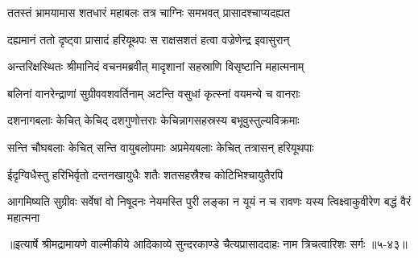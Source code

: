 \twolineshloka
{ततस्तं भ्रामयामास शतधारं महाबलः}
{तत्र चाग्निः समभवत् प्रासादश्चाप्यदह्यत} %

\twolineshloka
{दह्यमानं ततो दृष्ट्वा प्रासादं हरियूथपः}
{स राक्षसशतं हत्वा वज्रेणेन्द्र इवासुरान्} %

\twolineshloka
{अन्तरिक्षस्थितः श्रीमानिदं वचनमब्रवीत्}
{मादृशानां सहस्राणि विसृष्टानि महात्मनाम्} %

\twolineshloka
{बलिनां वानरेन्द्राणां सुग्रीववशवर्तिनाम्}
{अटन्ति वसुधां कृत्स्नां वयमन्ये च वानराः} %

\twolineshloka
{दशनागबलाः केचित् केचिद् दशगुणोत्तराः}
{केचिन्नागसहस्रस्य बभूवुस्तुल्यविक्रमाः} %

\twolineshloka
{सन्ति चौघबलाः केचित् सन्ति वायुबलोपमाः}
{अप्रमेयबलाः केचित् तत्रासन् हरियूथपाः} %

\twolineshloka
{ईदृग्विधैस्तु हरिभिर्वृतो दन्तनखायुधैः}
{शतैः शतसहस्रैश्च कोटिभिश्चायुतैरपि} %

\threelineshloka
{आगमिष्यति सुग्रीवः सर्वेषां वो निषूदनः}
{नेयमस्ति पुरी लङ्का न यूयं न च रावणः}
{यस्य त्विक्ष्वाकुवीरेण बद्धं वैरं महात्मना} %


॥इत्यार्षे श्रीमद्रामायणे वाल्मीकीये आदिकाव्ये सुन्दरकाण्डे चैत्यप्रासाददाहः नाम त्रिचत्वारिशः सर्गः ॥५-४३॥
